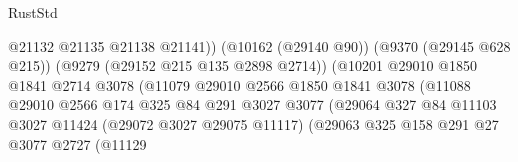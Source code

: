 \begin{lexlean}{RustStd}
\begin{coremodule}
                                                    @21132
                                                    @21135
                                                    @21138
                                                    @21141))
                                                (@10162 (@29140 @90))
                                                (@9370 (@29145 @628 @215))
                                                (@9279 (@29152 @215 @135 @2898 @2714))
                                                (@10201
                                                  @29010
                                                  @1850
                                                  @1841
                                                  @2714
                                                  @3078
                                                  (@11079
                                                    @29010
                                                    @2566
                                                    @1850
                                                    @1841
                                                    @3078
                                                    (@11088
                                                      @29010
                                                      @2566
                                                      @174
                                                      @325
                                                      @84
                                                      @291
                                                      @3027
                                                      @3077
                                                      (@29064
                                                        @327
                                                        @84
                                                        @11103
                                                        @3027
                                                        @11424
                                                        (@29072 @3027 @29075 @11117)
                                                        (@29063
                                                          @325
                                                          @158
                                                          @291
                                                          @27
                                                          @3077
                                                          @2727
                                                          (@11129

\end{coremodule}
\end{lexlean}
